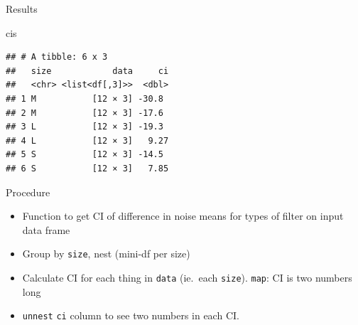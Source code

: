 \documentclass[ignorenonframetext,]{beamer}
\newenvironment{Shaded}{\begin{snugshade}}{\end{snugshade}}
\newcommand{\NormalTok}[1]{#1}
\begin{document}
\begin{frame}[fragile]{Results}
\protect\hypertarget{results}{}

\begin{Shaded}
\begin{Highlighting}[]
\NormalTok{cis}
\end{Highlighting}
\end{Shaded}

\begin{verbatim}
## # A tibble: 6 x 3
##   size            data     ci
##   <chr> <list<df[,3]>>  <dbl>
## 1 M           [12 × 3] -30.8 
## 2 M           [12 × 3] -17.6 
## 3 L           [12 × 3] -19.3 
## 4 L           [12 × 3]   9.27
## 5 S           [12 × 3] -14.5 
## 6 S           [12 × 3]   7.85
\end{verbatim}

\end{frame}

\begin{frame}[fragile]{Procedure}
\protect\hypertarget{procedure}{}

\begin{itemize}
\item
  Function to get CI of difference in noise means for types of filter on
  input data frame
\item
  Group by \texttt{size}, nest (mini-df per size)
\item
  Calculate CI for each thing in \texttt{data} (ie.~each \texttt{size}).
  \texttt{map}: CI is two numbers long
\item
  \texttt{unnest} \texttt{ci} column to see two numbers in each CI.
\end{itemize}

\end{frame}
\end{document}
